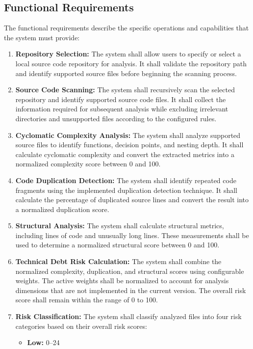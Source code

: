 \subsection{Functional Requirements}
The functional requirements describe the specific operations and capabilities that the system must provide:
\begin{enumerate}
    \item \textbf{Repository Selection:} The system shall allow users to specify or select a local source code repository for analysis. It shall validate the repository path and identify supported source files before beginning the scanning process.
    \item \textbf{Source Code Scanning:} The system shall recursively scan the selected repository and identify supported source code files. It shall collect the information required for subsequent analysis while excluding irrelevant directories and unsupported files according to the configured rules.
    \item \textbf{Cyclomatic Complexity Analysis:} The system shall analyze supported source files to identify functions, decision points, and nesting depth. It shall calculate cyclomatic complexity and convert the extracted metrics into a normalized complexity score between 0 and 100.
    \item \textbf{Code Duplication Detection:} The system shall identify repeated code fragments using the implemented duplication detection technique. It shall calculate the percentage of duplicated source lines and convert the result into a normalized duplication score.
    \item \textbf{Structural Analysis:} The system shall calculate structural metrics, including lines of code and unusually long lines. These measurements shall be used to determine a normalized structural score between 0 and 100.
    \item \textbf{Technical Debt Risk Calculation:} The system shall combine the normalized complexity, duplication, and structural scores using configurable weights. The active weights shall be normalized to account for analysis dimensions that are not implemented in the current version. The overall risk score shall remain within the range of 0 to 100.
    \item \textbf{Risk Classification:} The system shall classify analyzed files into four risk categories based on their overall risk scores:
    \begin{itemize}
        \item \textbf{Low:} 0--24

\end{itemize}
\end{enumerate}

